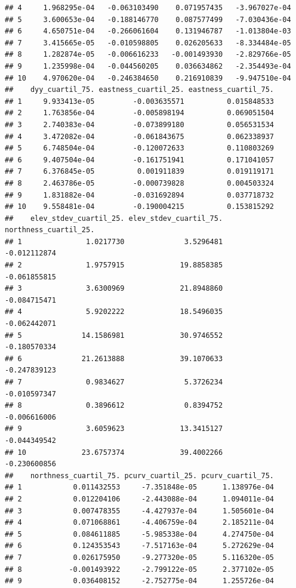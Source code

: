 \documentclass[11pt,]{article}
\begin{document}
\begin{verbatim}
## 4     1.968295e-04   -0.063103490    0.071957435   -3.967027e-04
## 5     3.600653e-04   -0.188146770    0.087577499   -7.030436e-04
## 6     4.650751e-04   -0.266061604    0.131946787   -1.013804e-03
## 7     3.415665e-05   -0.010598805    0.026205633   -8.334484e-05
## 8     1.282874e-05   -0.006616233   -0.001493930   -2.829766e-05
## 9     1.235998e-04   -0.044560205    0.036634862   -2.354493e-04
## 10    4.970620e-04   -0.246384650    0.216910839   -9.947510e-04
##    dyy_cuartil_75. eastness_cuartil_25. eastness_cuartil_75.
## 1     9.933413e-05         -0.003635571          0.015848533
## 2     1.763856e-04         -0.005898194          0.069051504
## 3     2.740383e-04         -0.073899180          0.056531534
## 4     3.472082e-04         -0.061843675          0.062338937
## 5     6.748504e-04         -0.120072633          0.110803269
## 6     9.407504e-04         -0.161751941          0.171041057
## 7     6.376845e-05          0.001911839          0.019119171
## 8     2.463786e-05         -0.000739828          0.004503324
## 9     1.831882e-04         -0.031692894          0.037718732
## 10    9.558481e-04         -0.190004215          0.153815292
##    elev_stdev_cuartil_25. elev_stdev_cuartil_75. northness_cuartil_25.
## 1               1.0217730              3.5296481          -0.012112874
## 2               1.9757915             19.8858385          -0.061855815
## 3               3.6300969             21.8948860          -0.084715471
## 4               5.9202222             18.5496035          -0.062442071
## 5              14.1586981             30.9746552          -0.180570334
## 6              21.2613888             39.1070633          -0.247839123
## 7               0.9834627              5.3726234          -0.010597347
## 8               0.3896612              0.8394752          -0.006616006
## 9               3.6059623             13.3415127          -0.044349542
## 10             23.6757374             39.4002266          -0.230600856
##    northness_cuartil_75. pcurv_cuartil_25. pcurv_cuartil_75.
## 1            0.011432553     -7.351848e-05      1.138976e-04
## 2            0.012204106     -2.443088e-04      1.094011e-04
## 3            0.007478355     -4.427937e-04      1.505601e-04
## 4            0.071068861     -4.406759e-04      2.185211e-04
## 5            0.084611885     -5.985338e-04      4.274750e-04
## 6            0.124353543     -7.517163e-04      5.272629e-04
## 7            0.026175950     -9.277320e-05      5.116320e-05
## 8           -0.001493922     -2.799122e-05      2.377102e-05
## 9            0.036408152     -2.752775e-04      1.255726e-04

\end{verbatim}
\end{document}
